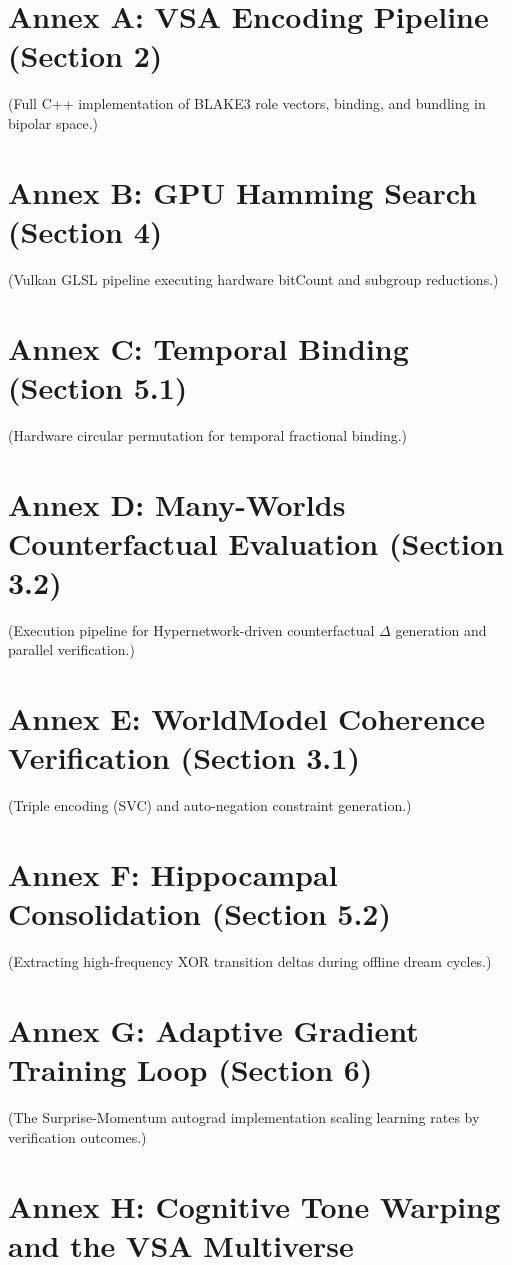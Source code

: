 \documentclass[10pt]{article}
\begin{document}
\section*{Annex A: VSA Encoding Pipeline (Section 2)}
(Full C++ implementation of BLAKE3 role vectors, binding, and bundling in bipolar space.)

\section*{Annex B: GPU Hamming Search (Section 4)}
(Vulkan GLSL pipeline executing hardware bitCount and subgroup reductions.)

\section*{Annex C: Temporal Binding (Section 5.1)}
(Hardware circular permutation for temporal fractional binding.)

\section*{Annex D: Many-Worlds Counterfactual Evaluation (Section 3.2)}
(Execution pipeline for Hypernetwork-driven counterfactual $\Delta$ generation and parallel verification.)

\section*{Annex E: WorldModel Coherence Verification (Section 3.1)}
(Triple encoding (SVC) and auto-negation constraint generation.)

\section*{Annex F: Hippocampal Consolidation (Section 5.2)}
(Extracting high-frequency XOR transition deltas during offline dream cycles.)

\section*{Annex G: Adaptive Gradient Training Loop (Section 6)}
(The Surprise-Momentum autograd implementation scaling learning rates by verification outcomes.)

\section*{Annex H: Cognitive Tone Warping and the VSA Multiverse}
\end{document}
